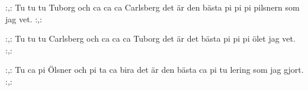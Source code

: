 	
\beginverse*						
:,: Tu tu tu Tuborg 
och ca ca ca Carlsberg 
det är den bästa 
pi pi pi pilsnern som jag vet. :,: 
\endverse						

\beginverse				
:,: Tu tu tu Carlsberg 
och ca ca ca Tuborg 
det är det bästa 
pi pi pi ölet jag vet. :,:
\endverse

\beginverse
:,: Tu ca pi Ölsner och 
pi ta ca bira 
det är den bästa 
ca pi tu lering som jag gjort. :,:
\endverse
\endsong		

